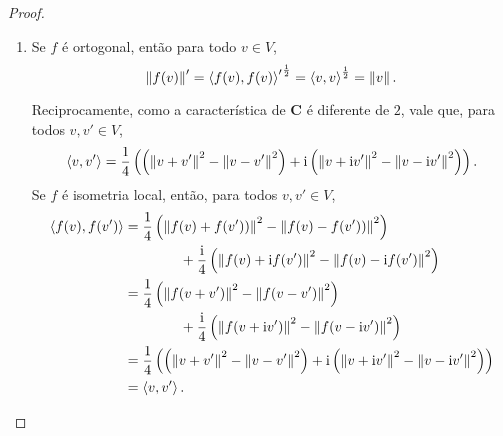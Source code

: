 \begin{proof}
	\begin{enumerate}
	\item Se $f$ é ortogonal, então para todo $v \in V$,
	\begin{equation*}
	\left\Vert{f(v)}\right\Vert' = {\left\langle{f(v)},{f(v)}\right\rangle'}^\frac{1}{2} = {\left\langle{v},{v}\right\rangle}^\frac{1}{2} = \left\Vert{v}\right\Vert.
	\end{equation*}
	
Reciprocamente, como a característica de $\bm C$ é diferente de $2$, vale que, para todos $v,v' \in V$,		
		\begin{equation*}
		\left\langle{v},{v'}\right\rangle = \frac{1}{4} \left( \left(\left\Vert{v+v'}\right\Vert^2 - \left\Vert{v-v'}\right\Vert^2\right) + \mathrm{i} \left(\left\Vert{v+\mathrm{i}v'}\right\Vert^2 - \left\Vert{v-\mathrm{i}v'}\right\Vert^2\right) \right).
		\end{equation*}
Se $f$ é isometria local, então, para todos $v,v' \in V$,
	\begin{align*}
		\left\langle{f(v)},{f(v')}\right\rangle 	&= \frac{1}{4}\left(\left\Vert{f(v)+f(v'))}\right\Vert^2 - \left\Vert{f(v)-f(v'))}\right\Vert^2\right) \\
		&\qquad\qquad + \frac{\mathrm{i}}{4} \left(\left\Vert{f(v)+\mathrm{i}f(v')}\right\Vert^2 - \left\Vert{f(v)-\mathrm{i}f(v')}\right\Vert^2\right) \\
		&= \frac{1}{4}\left(\left\Vert{f(v+v')}\right\Vert^2 - \left\Vert{f(v-v')}\right\Vert^2\right) \\
		&\qquad\qquad + \frac{\mathrm{i}}{4}\left(\left\Vert{f(v+\mathrm{i}v')}\right\Vert^2 - \left\Vert{f(v-\mathrm{i}v')}\right\Vert^2\right) \ \\
		&= \frac{1}{4} \left( \left(\left\Vert{v+v'}\right\Vert^2 - \left\Vert{v-v'}\right\Vert^2\right) + \mathrm{i} \left(\left\Vert{v+\mathrm{i}v'}\right\Vert^2 - \left\Vert{v-\mathrm{i}v'}\right\Vert^2\right) \right) \\
		&= \left\langle{v},{v'}\right\rangle.
	\end{align*}
	

	
	

\end{enumerate}
\end{proof}
